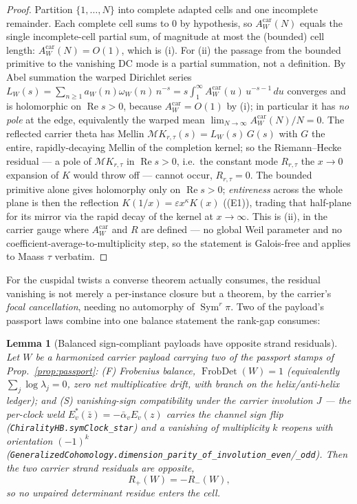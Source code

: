 \documentclass[11pt]{article}
\newtheorem{lemma}[theorem]{Lemma}
\theoremstyle{definition}
\renewcommand{\Re}{\operatorname{Re}}
\newcommand{\Sym}{\operatorname{Sym}}
\begin{document}
\begin{proof}
Partition $\{1,\dots,N\}$ into complete adapted cells and one incomplete remainder. Each complete cell sums
to $0$ by hypothesis, so $A^{\mathrm{car}}_W(N)$ equals the single incomplete-cell partial sum, of magnitude
at most the (bounded) cell length: $A^{\mathrm{car}}_W(N)=O(1)$, which is \textup{(i)}. For \textup{(ii)} the
passage from the bounded primitive to the vanishing DC mode is a partial summation, not a definition. By Abel
summation the warped Dirichlet series
$L_W(s)=\sum_{n\ge1}a_W(n)\omega_W(n)\,n^{-s}=s\!\int_1^\infty A^{\mathrm{car}}_W(u)\,u^{-s-1}\,du$ converges and is
holomorphic on $\Re s>0$, because $A^{\mathrm{car}}_W=O(1)$ by \textup{(i)}; in particular it has \emph{no pole}
at the edge, equivalently the warped mean $\lim_{N\to\infty}A^{\mathrm{car}}_W(N)/N=0$. The reflected carrier
theta has Mellin $\mathcal M K_{r,\tau}(s)=L_W(s)\,G(s)$ with $G$ the entire, rapidly-decaying Mellin of the
completion kernel; so the Riemann--Hecke residual --- a pole of $\mathcal M K_{r,\tau}$ in $\Re s>0$, i.e.\ the
constant mode $R_{r,\tau}$ the $x\to0$ expansion of $K$ would throw off --- cannot occur, $R_{r,\tau}=0$. The
bounded primitive alone gives holomorphy only on $\Re s>0$; \emph{entireness} across the whole plane is then the
reflection $K(1/x)=\varepsilon x^{\kappa}K(x)$ (\textup{(E1)}), trading that half-plane for its mirror via the
rapid decay of the kernel at $x\to\infty$. This is \textup{(ii)}, in the carrier gauge where $A^{\mathrm{car}}_W$
and $R$ are defined --- no global Weil parameter and no coefficient-average-to-multiplicity step, so the
statement is Galois-free and applies to Maass $\tau$ verbatim.
\end{proof}

For the cuspidal twists a converse theorem actually consumes, the residual vanishing is not merely a
per-instance closure but a theorem, by the carrier's \emph{focal cancellation}, needing no automorphy of
$\Sym^r\pi$. Two of the payload's passport laws combine into one balance statement the rank-gap consumes:

\begin{lemma}[Balanced sign-compliant payloads have opposite strand residuals]\label{lem:signcomp}
Let $W$ be a harmonized carrier payload carrying two of the passport stamps of
Prop.~\ref{prop:passport}: \textup{(F)} \emph{Frobenius balance}, $\operatorname{FrobDet}(W)=1$
(equivalently $\sum_j\log\lambda_j=0$, zero net multiplicative drift, with branch on the helix/anti-helix
ledger); and \textup{(S)} \emph{vanishing-sign compatibility} under the carrier involution $J$ --- the
per-clock weld $E_v^{*}(\bar z)=-\bar\alpha_v E_v(z)$ carries the channel sign flip
(\texttt{ChiralityHB.symClock\_star}) and a vanishing of multiplicity $k$ reopens with orientation $(-1)^k$
(\texttt{GeneralizedCohomology.dimension\_parity\_of\_involution\_even}/\texttt{\_odd}). Then the two carrier
strand residuals are opposite,
\[
  R_+(W)=-R_-(W),
\]
so no unpaired determinant residue enters the cell.
\end{lemma}
\end{document}
